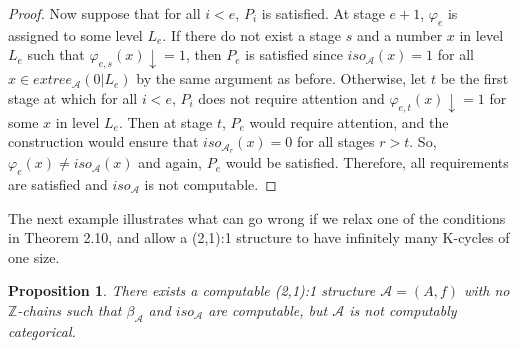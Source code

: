 \documentclass[12pt]{article}
\newtheorem{prop}[thm]{Proposition}
\begin{document}
\begin{proof}
Now suppose that for all $i<e$, $P_i$ is satisfied. At stage $e+1$, $\varphi_e$ is assigned to some level $L_e$. If there do not exist a stage $s$ and a number $x$ in level $L_e$ such that $\varphi_{e,s}(x)\downarrow=1$, then $P_e$ is satisfied since $iso_\mathcal{A}(x)=1$ for all $x \in extree_{\mathcal{A}}(0|L_e)$ by the same argument as before. Otherwise, let $t$ be the first stage at which for all $i<e$, $P_i$ does not require attention and $\varphi_{e,t}(x)\downarrow=1$ for some $x$ in level $L_e$. Then at stage $t$, $P_e$ would require attention, and the construction would ensure that $iso_{\mathcal{A}_r}(x)=0$ for all stages $r>t$. So, $\varphi_e(x) \not= iso_{\mathcal{A}}(x)$ and again, $P_e$ would be satisfied. Therefore, all requirements are satisfied and $iso_\mathcal{A}$ is not computable.
\end{proof}

The next example illustrates what can go wrong if we relax one of the conditions in Theorem 2.10, and allow a (2,1):1 structure to have infinitely many K-cycles of one size.

\begin{prop}
There exists a computable (2,1):1 structure $\mathcal{A}=(A,f)$ with no $\mathbb{Z}$-chains such that $\beta_\mathcal{A}$ and $iso_\mathcal{A}$ are computable, but $\mathcal{A}$ is not computably categorical.
\end{prop}
\end{document}
